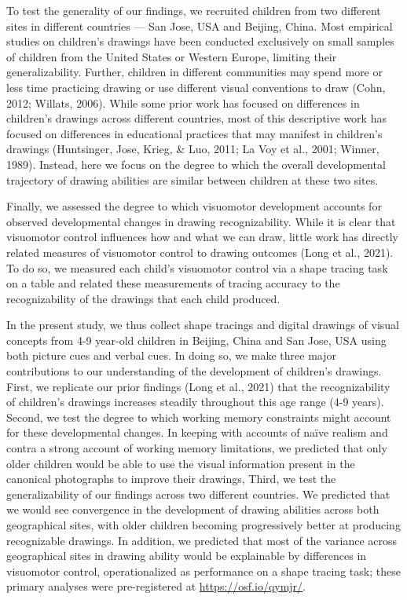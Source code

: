 \documentclass[
  english,
  man]{apa6}
\begin{document}
To test the generality of our findings, we recruited children from two different sites in different countries --- San Jose, USA and Beijing, China.
Most empirical studies on children's drawings have been conducted exclusively on small samples of children from the United States or Western Europe, limiting their generalizability. Further, children in different communities may spend more or less time practicing drawing or use different visual conventions to draw (Cohn, 2012; Willats, 2006). While some prior work has focused on differences in children's drawings across different countries, most of this descriptive work has focused on differences in educational practices that may manifest in children's drawings (Huntsinger, Jose, Krieg, \& Luo, 2011; La Voy et al., 2001; Winner, 1989). Instead, here we focus on the degree to which the overall developmental trajectory of drawing abilities are similar between children at these two sites.

Finally, we assessed the degree to which visuomotor development accounts for observed developmental changes in drawing recognizability. While it is clear that visuomotor control influences how and what we can draw, little work has directly related measures of visuomotor control to drawing outcomes (Long et al., 2021). To do so, we measured each child's visuomotor control via a shape tracing task on a table and related these measurements of tracing accuracy to the recognizability of the drawings that each child produced.

In the present study, we thus collect shape tracings and digital drawings of visual concepts from 4-9 year-old children in Beijing, China and San Jose, USA using both picture cues and verbal cues. In doing so, we make three major contributions to our understanding of the development of children's drawings. First, we replicate our prior findings (Long et al., 2021) that the recognizability of children's drawings increases steadily throughout this age range (4-9 years). Second, we test the degree to which working memory constraints might account for these developmental changes. In keeping with accounts of naïve realism and contra a strong account of working memory limitations, we predicted that only older children would be able to use the visual information present in the canonical photographs to improve their drawings, Third, we test the generalizability of our findings across two different countries. We predicted that we would see convergence in the development of drawing abilities across both geographical sites, with older children becoming progressively better at producing recognizable drawings. In addition, we predicted that most of the variance across geographical sites in drawing ability would be explainable by differences in visuomotor control, operationalized as performance on a shape tracing task; these primary analyses were pre-registered at \url{https://osf.io/qymjr/}.
\end{document}
